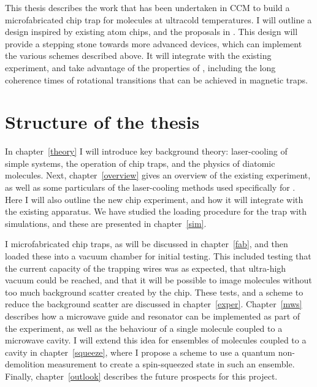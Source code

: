 This thesis describes the work that has been undertaken in CCM to build a
microfabricated chip trap for \CaF{} molecules at ultracold temperatures. I
will outline a design inspired by existing atom chips, and the proposals in
. This design will provide a stepping stone towards more
advanced devices, which can implement the various schemes described above. It
will integrate with the existing experiment, and take advantage of the
properties of \CaF{}, including the long coherence times of rotational
transitions that can be achieved in magnetic traps.

\section{Structure of the thesis}

In chapter~\ref{theory} I will introduce key background theory: 
laser-cooling of simple systems, the operation of chip traps, and the physics
of diatomic molecules. Next, chapter~\ref{overview} gives an overview of the
existing \CaF{} experiment, as well as some particulars of the laser-cooling
methods used specifically for \CaF{}. Here I will also outline the new chip
experiment, and how it will integrate with the existing apparatus. We have
studied the loading procedure for the trap with simulations, and these are
presented in chapter~\ref{sim}.

I microfabricated chip traps, as will be discussed in chapter~\ref{fab}, and
then loaded these into a vacuum chamber for initial testing. This included
testing that the current capacity of the trapping wires was as expected, that
ultra-high vacuum could be reached, and that it will be possible to image
molecules without too much background scatter created by the chip. These tests,
and a scheme to reduce the background scatter are discussed in
chapter~\ref{exper}. Chapter~\ref{mws} describes how a microwave guide and
resonator can be implemented as part of the experiment, as well as the
behaviour of a single molecule coupled to a microwave cavity. I will extend
this idea for ensembles of molecules coupled to a cavity in
chapter~\ref{squeeze}, where I propose a scheme to use a quantum non-demolition
measurement to create a spin-squeezed state in such an ensemble. Finally,
chapter~\ref{outlook} describes the future prospects for this project.
